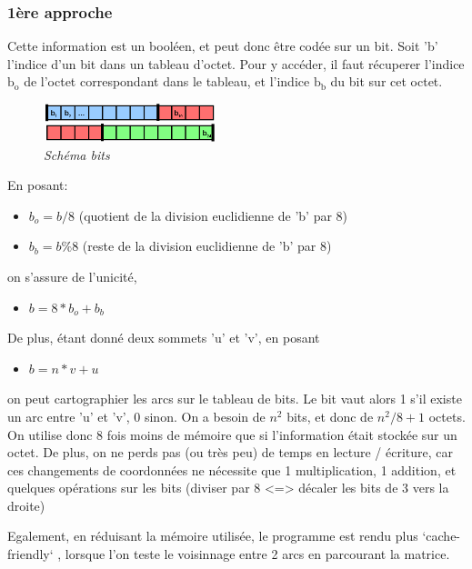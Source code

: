 \documentclass[10pt]{article}
\begin{document}
			\subsubsection{1ère approche}

				Cette information est un booléen, et peut donc être codée sur un bit.
				Soit 'b' l'indice d'un bit dans un tableau d'octet.
				Pour y accéder, il faut récuperer l'indice $\textrm{b}_\textrm{o}$ de l'octet correspondant dans le tableau,
				et l'indice $\textrm{b}_\textrm{b}$ du bit sur cet octet.\newline
				
				\begin{figure}
					\includegraphics[width=5cm]{./images/bits.png}
					\caption{\textit{Schéma bits}}
				\end{figure}
				
				En posant:
				\begin{itemize}[label=-]
					\item \(b_o = b / 8\) (quotient de la division euclidienne de 'b' par 8)
					\item \(b_b = b \% 8\) (reste de la division euclidienne de 'b' par 8)
				\end{itemize}
				on s'assure de l'unicité,
				\begin{itemize}[label=-]
					\item \(b = 8*b_o+b_b\)
				\end{itemize}
				De plus, étant donné deux sommets 'u' et 'v', en posant
				\begin{itemize}[label=-]
					\item \(b = n * v + u\)
				\end{itemize}
				on peut cartographier les arcs sur le tableau de bits. Le bit vaut alors 1 s'il existe un arc entre 'u' et 'v', 0 sinon.
				On a besoin de \(n^2\) bits, et donc de \(n^2 / 8 + 1\) octets.
				On utilise donc 8 fois moins de mémoire que si l'information était stockée sur un octet.
				De plus, on ne perds pas (ou très peu) de temps en lecture / écriture, car ces changements
				de coordonnées ne nécessite que 1 multiplication, 1 addition, et quelques opérations sur les bits (diviser par 8 <=> décaler
				les bits de 3 vers la droite)
				
				Egalement, en réduisant la mémoire utilisée, le programme est rendu plus `cache-friendly` \cite{cache_friendly},
				lorsque l'on teste le voisinnage entre 2 arcs en parcourant la matrice.\newline
				 
\end{document}
